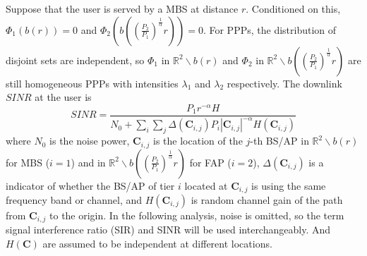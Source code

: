 \documentclass[a4paper,twocolumn]{IEEEtran}
\begin{document}
Suppose that the user is served by a MBS at distance $r$. Conditioned on this, $\Phi_1(b(r)) = 0$ and $\Phi_2( b( ( \frac{P_2}{P_1} )^\frac{1}{\alpha} r) ) = 0$. For PPPs, the distribution of disjoint sets are independent, so $\Phi_1$ in $\mathbb{R}^2 \backslash b(r)$ and $\Phi_2$ in $\mathbb{R}^2 \backslash b( ( \frac{P_2}{P_1} )^\frac{1}{\alpha} r)$ are still homogeneous PPPs with intensities $\lambda_1$ and $\lambda_2$ respectively. The downlink $SINR$ at the user is 
\begin{equation}
SINR = \frac{P_1 r^{-\alpha} H}{N_0 + \sum_i\sum_j \Delta(\bm{C}_{i,j}) P_i | \bm{C}_{i,j} |^{-\alpha} H(\bm{C}_{i,j})}
\end{equation}
where $N_0$ is the noise power, $\bm{C}_{i,j}$ is the location of the $j$-th BS/AP in $\mathbb{R}^2 \backslash b(r)$ for MBS ($i=1$) and in $\mathbb{R}^2 \backslash b( ( \frac{P_2}{P_1} )^\frac{1}{\alpha} r)$ for FAP ($i=2$), $\Delta(\bm{C}_{i,j})$ is a indicator of whether the BS/AP of tier $i$ located at $\bm{C}_{i,j}$ is using the same frequency band or channel, and $H(\bm{C}_{i,j})$ is random channel gain of the path from $\bm{C}_{i,j}$ to the origin. In the following analysis, noise is omitted, so the term signal interference ratio (SIR) and SINR will be used interchangeably. And $H(\bm{C})$ are assumed to be independent at different locations.
 
\end{document}

